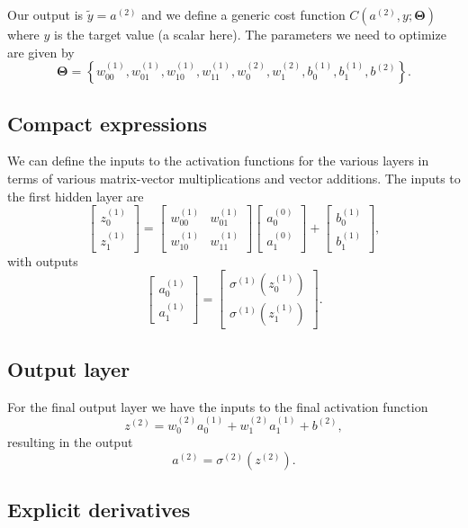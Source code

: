 \documentclass[%
oneside,                 %
final,                   %
10pt]{article}
\begin{document}
Our output is $\tilde{y}=a^{(2)}$ and we define a generic cost function $C(a^{(2)},y;\bm{\Theta})$ where $y$ is the target value (a scalar here).
The parameters we need to optimize are given by
\[
\bm{\Theta}=\left\{w_{00}^{(1)},w_{01}^{(1)},w_{10}^{(1)},w_{11}^{(1)},w_{0}^{(2)},w_{1}^{(2)},b_0^{(1)},b_1^{(1)},b^{(2)}\right\}.
\]

\subsection{Compact expressions}

We can define the inputs to the activation functions for the various layers in terms of various matrix-vector multiplications and vector additions.
The inputs to the first hidden layer are
\[
\begin{bmatrix}z_0^{(1)} \\ z_1^{(1)} \end{bmatrix}=\begin{bmatrix}w_{00}^{(1)} & w_{01}^{(1)}\\ w_{10}^{(1)} &w_{11}^{(1)} \end{bmatrix}\begin{bmatrix}a_0^{(0)} \\ a_1^{(0)} \end{bmatrix}+\begin{bmatrix}b_0^{(1)} \\ b_1^{(1)} \end{bmatrix},
\]
with outputs
\[
\begin{bmatrix}a_0^{(1)} \\ a_1^{(1)} \end{bmatrix}=\begin{bmatrix}\sigma^{(1)}(z_0^{(1)}) \\ \sigma^{(1)}(z_1^{(1)}) \end{bmatrix}.
\]

\subsection{Output layer}

For the final output layer we have the inputs to the final activation function 
\[
z^{(2)} = w_{0}^{(2)}a_0^{(1)} +w_{1}^{(2)}a_1^{(1)}+b^{(2)},
\]
resulting in the  output
\[
a^{(2)}=\sigma^{(2)}(z^{(2)}).
\]

\subsection{Explicit derivatives}
\end{document}
